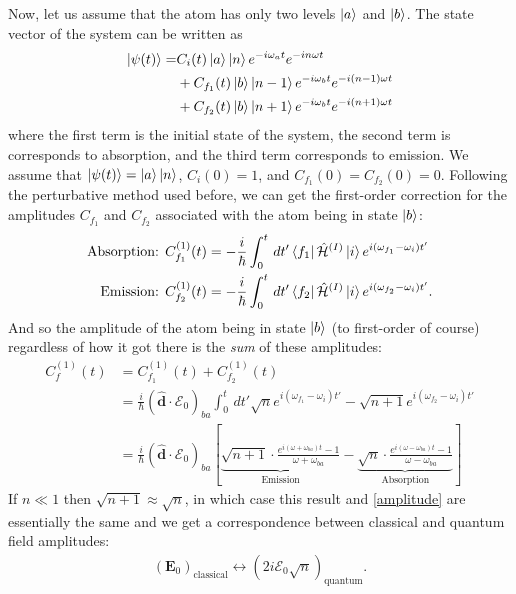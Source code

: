 \documentclass{book}
\theoremstyle{definition}
\newcommand{\ham}{\mathcal{H}}
\newcommand{\f}[2]{\frac{#1}{#2}}
\newcommand{\lp}{\left(}
\newcommand{\rp}{\right)}
\newcommand{\lb}{\left[}
\newcommand{\rb}{\right]}
\begin{document}
Now, let us assume that the atom has only two levels $\ket{a}$ and $\ket{b}$. The state vector of the system can be written as
\begin{align}
\ket{\psi(t)} = &C_i(t)\ket{a}\ket{n}e^{-i\omega_a t}e^{-i n \omega t } \nonumber\\
&+ C_{f_1}(t)\ket{b}\ket{n-1}e^{-i\omega_b t}e^{-i (n-1) \omega t } \nonumber\\
&+ C_{f_2}(t)\ket{b}\ket{n+1}e^{-i\omega_b t}e^{-i (n+1) \omega t } 
\end{align}
where the first term is the initial state of the system, the second term is corresponds to absorption, and the third term corresponds to emission. We assume that $\ket{\psi(t)} = \ket{a}\ket{n}$, $C_i(0) = 1$, and $C_{f_1}(0) = C_{f_2}(0) = 0$. Following the perturbative method used before, we can get the first-order correction
for the amplitudes $C_{f_1}$ and $C_{f_2}$ associated with the atom being in state $\ket{b}$:
\begin{align}
\text{Absorption: }&C_{f_1}^{(1)}(t) = -\f{i}{\hbar}\int_0^t \,dt' \bra{f_1}\hat{\ham}^{(I)}\ket{i}e^{i(\omega_{f_1} - \omega_i)t'}\\
\text{Emission: }&C_{f_2}^{(1)}(t) = -\f{i}{\hbar}\int_0^t \,dt' \bra{f_2}\hat{\ham}^{(I)}\ket{i}e^{i(\omega_{f_2} - \omega_i)t'}.
\end{align}
And so the amplitude of the atom being in state $\ket{b}$ (to first-order of course) regardless of how it got there is the \textit{sum} of these amplitudes:
\begin{align}\label{quantum_amp}
C_f^{(1)}(t) &= C_{f_1}^{(1)}(t) + C_{f_2}^{(1)}(t)\\
&= \f{i}{\hbar}\lp \hat{\mathbf{d}}\cdot\bm{\mathcal{E}}_0 \rp_{ba}\int^t_0 \,dt'  \sqrt{n}  e^{i(\omega_{f_1} - \omega_i)t'} 
- \sqrt{n+1}  e^{i(\omega_{f_2} - \omega_i)t'}\\
&= \boxed{\f{i}{\hbar}\lp \hat{\mathbf{d}}\cdot\bm{\mathcal{E}}_0 \rp_{ba}
\lb \underbrace{\sqrt{n+1}\cdot\f{e^{i(\omega + \omega_{ba})t} - 1}{ \omega + \omega_{ba} }}_\text{Emission}  - \underbrace{\sqrt{n}\cdot\f{e^{i(\omega - \omega_{ba})t} - 1}{\omega - \omega_{ba}}}_{\text{Absorption}}\rb}
\end{align}
If $n\ll 1$ then $\sqrt{n+1} \approx \sqrt{n}$, in which case this result and \eqref{amplitude} are essentially the same and we get a correspondence between classical and quantum field amplitudes:
\begin{align}
\lp \mathbf{E}_0 \rp_\text{classical} \leftrightarrow \lp 2i\mathcal{E}_0\sqrt{n} \rp_\text{quantum}.
\end{align}
\end{document}
